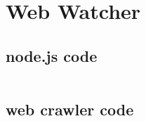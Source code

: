 \documentclass[11pt]{article}%
\begin{document}
\newpage
\section{Web Watcher} 
\subsection{node.js code}
\begin{lstlisting}[breaklines]
\end{lstlisting}

\subsection{web crawler code}
\begin{lstlisting}[breaklines]
\end{lstlisting}
\end{document}
